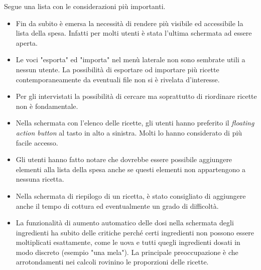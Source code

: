 Segue una lista con le considerazioni più importanti.
\begin{itemize}
  \item Fin da subito è emersa la necessità di rendere più visibile ed accessibile la lista della spesa.
    Infatti per molti utenti è stata l'ultima schermata ad essere aperta.

  \item Le voci "esporta" ed "importa" nel menù laterale non sono sembrate utili a nessun utente.
    La possibilità di esportare od importare più ricette contemporaneamente da eventuali file non si è rivelata d'interesse.

  \item Per gli intervistati la possibilità di cercare ma soprattutto di riordinare ricette non è fondamentale.

\item Nella schermata con l'elenco delle ricette, gli utenti hanno preferito il \textit{floating action button} al tasto in alto a sinistra.
  Molti lo hanno considerato di più facile accesso.

  \item Gli utenti hanno fatto notare che dovrebbe essere possibile aggiungere elementi alla lista della spesa anche se questi elementi non appartengono a nessuna ricetta.

  \item Nella schermata di riepilogo di un ricetta, è stato consigliato di aggiungere anche il tempo di cottura ed eventualmente un grado di difficoltà.

  \item La funzionalità di aumento automatico delle dosi nella schermata degli ingredienti ha subito delle critiche perché certi ingredienti non possono essere moltiplicati esattamente, come le uova e tutti quegli ingredienti dosati in modo discreto (esempio "una mela").
    La principale preoccupazione è che arrotondamenti nei calcoli rovinino le proporzioni delle ricette.
\end{itemize}

